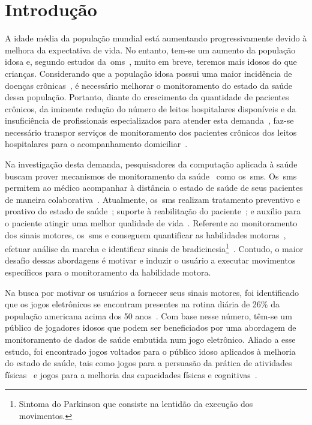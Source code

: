 \chapter{Introdu\c{c}\~{a}o} \label{chapter:intro}

A idade média da população mundial está aumentando progressivamente devido à melhora da expectativa de vida. No entanto, tem-se um aumento da população idosa e, segundo estudos da~\ac{oms}~\cite{ageing2011}, muito em breve, teremos mais idosos do que crianças. Considerando que a população idosa possui uma maior incidência de doenças crônicas~\cite{prevcronica2009}, é necessário melhorar o monitoramento do estado da saúde dessa população. Portanto, diante do crescimento da quantidade de pacientes crônicos, da iminente redução do número de leitos hospitalares disponíveis e da insuficiência de profissionais especializados para atender esta demanda~\cite{healthmonitoring2013}, faz-se necessário transpor serviços de monitoramento dos pacientes crônicos dos leitos hospitalares para o acompanhamento domiciliar~\cite{homecarebrazil2011}. 

Na investigação desta demanda, pesquisadores da computação aplicada à saúde buscam prover mecanismos de monitoramento da saúde~\cite{healthmonitoring2013,bardram2010,aarhus_negotiating_2010} como os~\ac{sms}. Os~\ac{sms} permitem ao médico acompanhar à distância o estado de saúde de seus pacientes de maneira colaborativa~\cite{healthmonitoring2013}. Atualmente, os~\ac{sms} realizam tratamento preventivo e proativo do estado de saúde~\cite{bardram2010}; suporte à reabilitação do paciente~\cite{sacbespoke2014}; e auxílio para o paciente atingir uma melhor qualidade de vida~\cite{sacsvmhms2014}. Referente ao monitoramento dos sinais motores, os~\ac{sms} e conseguem quantificar as habilidades motoras~\cite{manumeterjbhi2014,patel_monitoring_2009}, efetuar análise da marcha \cite{robotgait2014} e identificar sinais de bradicinesia\footnote{Sintoma do Parkinson que consiste na lentidão da execução dos movimentos.}~\cite{ambulatoryparkinson2010}. Contudo, o maior desafio dessas abordagens é motivar e induzir o usuário a executar movimentos específicos para o monitoramento da habilidade motora.

Na busca por motivar os usuários a fornecer seus sinais motores, foi identificado que os jogos eletrônicos se encontram presentes na rotina diária de 26\% da população americana acima dos 50 anos~\cite{esa2016}. Com base nesse número, têm-se um público de jogadores idosos que podem ser beneficiados por uma abordagem de monitoramento de dados de saúde embutida num jogo eletrônico. Aliado a esse estudo, foi encontrado jogos voltados para o público idoso aplicados à melhoria do estado de saúde, tais como jogos para a persuasão da prática de atividades físicas~\cite{seriousgameolder2015} e jogos para a melhoria das capacidades físicas e cognitivas~\cite{arntzen2011}. 

